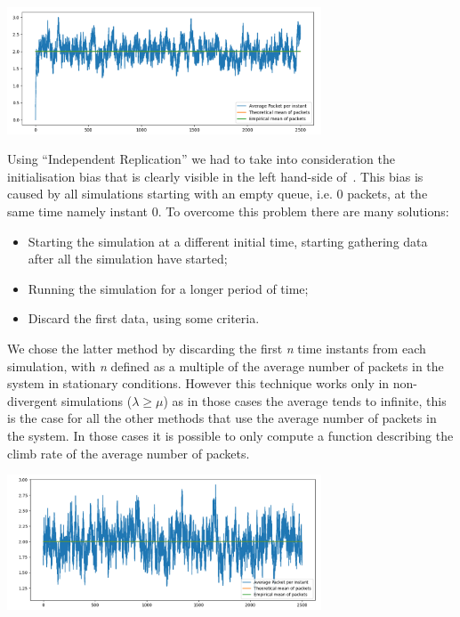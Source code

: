 \documentclass[10pt,a4paper]{article}
\begin{document}
\begin{center}
  \includegraphics[width=0.7\textwidth]{independent-replication-with-bias.png}
  \label{fig:independent-replication-with-bias}
\end{center}

Using ``Independent Replication'' we had to take into consideration the initialisation bias that is clearly visible in the left hand-side of~. This bias is caused by all simulations starting with an empty queue, i.e. 0 packets, at the same time namely instant 0. To overcome this problem there are many solutions:
\begin{itemize}
\item Starting the simulation at a different initial time, starting gathering data after all the simulation have started;
\item Running the simulation for a longer period of time;
\item Discard the first data, using some criteria.
\end{itemize}

We chose the latter method by discarding the first \emph{n} time instants from each simulation, with \emph{n} defined as a multiple of the average number of packets in the system in stationary conditions. However this technique works only in non-divergent simulations (\(\lambda\geq\mu\)) as in those cases the average tends to infinite, this is the case for all the other methods that use the average number of packets in the system. In those cases it is possible to only compute a function describing the climb rate of the average number of packets.

\begin{center}
  \includegraphics[width=0.7\textwidth]{independent-replication-without-bias.png}
  \label{fig:independent-replication-without-bias}
\end{center}
\end{document}
